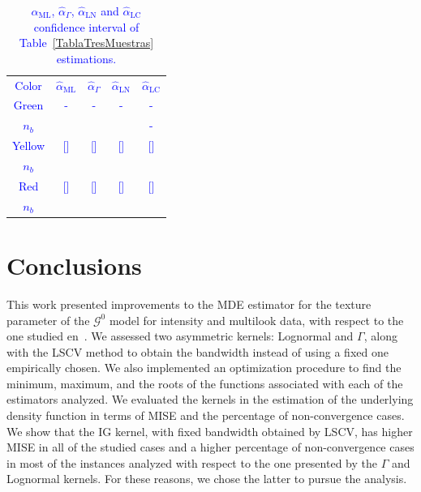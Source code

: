 \documentclass[twocolumn]{svjour3}
\begin{document}
		\begin{table}[hbt]
		\addtolength{\tabcolsep}{-4pt}
		\centering
		\caption{ $\widehat{\alpha}_{\text{{ML}}}$, $\widehat{\alpha}_{\Gamma}$, $\widehat{\alpha}_{\text{{LN}}}$ and $\widehat{\alpha}_{\text{{LC}}}$ confidence interval of Table~\ref{TablaTresMuestras} estimations.}\label{ICTresMuestras}
		\textcolor{blue}{
			\begin{tabular}{c*4{c}}
				\toprule
				Color       &  $\widehat{\alpha}_{\text{{ML}}}$    &  $\widehat{\alpha}_{\Gamma}$  &  $\widehat{\alpha}_{\text{{LN}}}$ &  $\widehat{\alpha}_{\text{{LC}}}$\\
				\cmidrule(lr){1-5}
				Green      & - & - & - & -\\
				$n_{b}$    &           &           &           &    -      \\
				\cmidrule(lr){1-5}
				Yellow         & [] & [] & [] & []\\
				$n_{b}$    &           &           &           &          \\
				\cmidrule(lr){1-5}
				Red        & [] & [] & [] & []\\
				$n_{b}$    &           &           &           &          \\
				\bottomrule
			\end{tabular}
		}
	\end{table} 	

	\section{Conclusions}
	\label{conclusion}
	
	This work presented improvements to the MDE estimator for the texture parameter of the $\mathcal{G}^0$ model for intensity and multilook data, with respect to the one studied en~\cite{gambini2015}. 
	We assessed two asymmetric kernels: Lognormal and $\Gamma$, along with the LSCV method to obtain the bandwidth instead of using a fixed one empirically chosen.
	We also implemented an optimization procedure to find the minimum, maximum, and the roots of the functions associated with each of the estimators analyzed.
	We evaluated the kernels in the estimation of the underlying density function in terms of MISE and the percentage of non-convergence cases. 
	We show that the IG kernel, with fixed bandwidth obtained by LSCV, has higher MISE in all of the studied cases and a higher percentage of non-convergence cases in most of the instances analyzed with respect to the one presented by the $\Gamma$ and Lognormal kernels. 
	For these reasons, we chose the latter to pursue the analysis.
	
\end{document}
